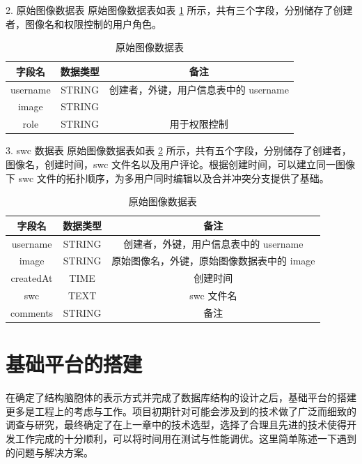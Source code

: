 2. 原始图像数据表
原始图像数据表如表 \ref{image-table} 所示，共有三个字段，分别储存了创建者，图像名和权限控制的用户角色。

\begin{table}
\centering
\caption{原始图像数据表}
\begin{tabular}{|c|c|c|}
			   \hline
                 字段名 & 数据类型 & 备注 \\
               \hline
                 username & STRING & 创建者，外键，用户信息表中的 username \\
               \hline
                 image & STRING &  \\
               \hline
                 role & STRING & 用于权限控制 \\
               \hline
             \end{tabular}
             \label{image-table}    
\end{table}

3. swc 数据表
原始图像数据表如表 \ref{swc-table} 所示，共有五个字段，分别储存了创建者，图像名，创建时间，swc 文件名以及用户评论。根据创建时间，可以建立同一图像下 swc 文件的拓扑顺序，为多用户同时编辑以及合并冲突分支提供了基础。

\begin{table}
\centering
\caption{原始图像数据表}
\begin{tabular}{|c|c|c|}
			   \hline
                 字段名 & 数据类型 & 备注 \\
               \hline
                 username & STRING & 创建者，外键，用户信息表中的 username \\
               \hline
                 image & STRING & 原始图像名，外键，原始图像数据表中的 image \\
               \hline
                 createdAt & TIME & 创建时间 \\
               \hline
                 swc & TEXT & swc 文件名 \\
               \hline
                 comments & STRING & 备注 \\
               \hline
             \end{tabular}
             \label{swc-table}    
\end{table}

\section{基础平台的搭建}
在确定了结构脑胞体的表示方式并完成了数据库结构的设计之后，基础平台的搭建更多是工程上的考虑与工作。项目初期针对可能会涉及到的技术做了广泛而细致的调查与研究，最终确定了在上一章中的技术选型，选择了合理且先进的技术使得开发工作完成的十分顺利，可以将时间用在测试与性能调优。这里简单陈述一下遇到的问题与解决方案。

